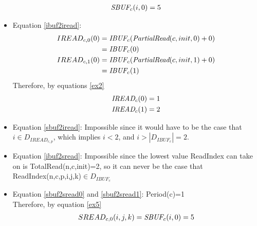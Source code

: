 \begin{itemize}
\begin{align}
\mbox{\it SBUF}_c(i,0)=5\label{ex5}
\end{align}
\item Equation \ref{ibuf2iread}:
\begin{align}
IREAD_{c,0}(0)&=\mbox{\it IBUF}_c(\mbox{\it PartialRead}(c,init,0)+0)\nonumber\\
&=\mbox{\it IBUF}_c(0)\label{ex6}\\
IREAD_{c,1}(0)&=\mbox{\it IBUF}_c(\mbox{\it PartialRead}(c,init,1)+0)\nonumber\\
&=\mbox{\it IBUF}_c(1)\nonumber
\end{align}
Therefore, by equations \ref{ex2}
\begin{align}
\mbox{\it IREAD}_c(0)&=1\label{ex7}\\
\mbox{\it IREAD}_c(1)&=2\nonumber
\end{align}
\item Equation \ref{sbuf2iread}: Impossible since it would have to be the case that $i\in D_{IREAD_{c,p}}$, which implies $i<2$, and $i>|D_{IBUF_c}|=2$.
\item Equation \ref{ibuf2sread}: Impossible since the lowest value ReadIndex can take on is TotalRead(n,c,init)=2, so it can never be the case that ReadIndex(n,c,p,i,j,k)$\in D_{IBUF_c}$
\item Equation \ref{sbuf2sread0} and \ref{sbuf2sread1}: Period(c)=1\\
Therefore, by equation \ref{ex5}
\begin{align}
SREAD_{c,0}(i,j,k)=\mbox{\it SBUF}_c(i,0)=5
\end{align}
\end{itemize}
